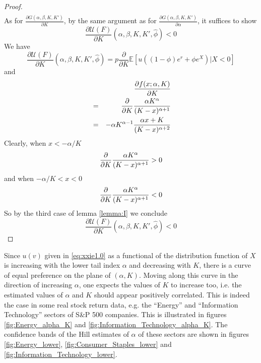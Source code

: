 \documentclass{article}
\newcommand{\pd}[2]{
  \frac{\partial #1}{\partial #2}
}
\newcommand{\opd}[1]{
  \frac{\partial}{\partial #1}
}
\newcommand{\E}{
  \mathbb{E}
}
\newcommand{\1}[1]{
  \mathbf{1}_{\{#1\}}
}
\begin{document}
\begin{proof}
\begin{eqnarray*}
  \end{eqnarray*}
  As for $\pd{G(\alpha, \beta, K, K')}{K}$, by the same argument as for
  $\pd{G(\alpha, \beta, K, K')}{\alpha}$, it suffices to show
  \[
  \pd{\mathcal U(F)}{K}(\alpha, \beta, K, K', \hat\phi) < 0
  \]
  We have
  \[
  \pd{\mathcal U(F)}{K}(\alpha, \beta, K, K', \hat\phi)
  = p \opd{K} \E \left[
    u((1 - \phi) e^r + \phi e^X)
    | X < 0
  \right] 
  \]
  and
  \begin{eqnarray*}
    && \pd{f(x; \alpha, K)}{K} \\
    &=& \opd{K} {\alpha K^\alpha \over (K - x)^{\alpha + 1}} \\
    &=&
    -\alpha K^{\alpha - 1} {
      \alpha x + K
      \over
      (K - x)^{\alpha + 2}
    }
  \end{eqnarray*}
  Clearly, when $x < -\alpha/K$
  \[
  \opd{K} {\alpha K^\alpha \over (K - x)^{\alpha + 1}} > 0
  \]
  and when $-\alpha/K < x < 0$
  \[
  \opd{K} {\alpha K^\alpha \over (K - x)^{\alpha + 1}} < 0
  \]
  So by the third case of lemma \ref{lemma:I} we conclude
  \[
  \pd{\mathcal U(F)}{K}(\alpha, \beta, K, K', \hat\phi) < 0  
  \]
\end{proof}
Since $u(v)$ given in \eqref{eq:xxie1.0} as a
functional of the distribution function of $X$ is increasing with the
lower tail index $\alpha$ and decreasing with $K$, there is a curve of
equal preference on the plane of $(\alpha, K)$. Moving along this
curve in the direction of increasing $\alpha$, one expects the values
of $K$ to increase too, i.e. the estimated values of $\alpha$ and $K$
should appear positively correlated. This is indeed the case in some
real stock return data, e.g. the ``Energy'' and ``Information Technology''
sectors of S\&P 500 companies. This is illustrated in figures
\ref{fig:Energy_alpha_K} and \ref{fig:Information_Technology_alpha_K}.
The confidence bands of the Hill estimates of $\alpha$ of these
sectors are shown in figures \ref{fig:Energy_lower},
\ref{fig:Consumer_Staples_lower} and
\ref{fig:Information_Technology_lower}.
\end{document}
